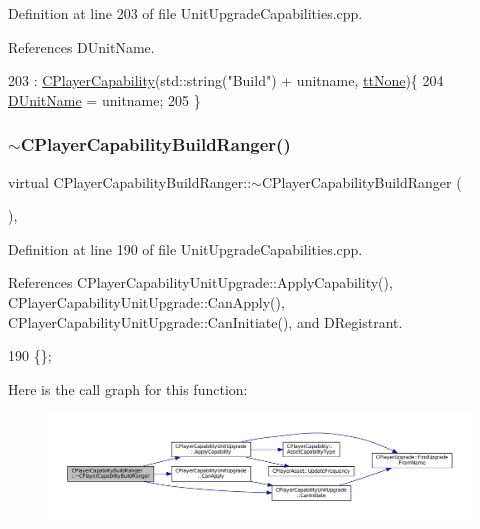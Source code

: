 Definition at line 203 of file Unit\+Upgrade\+Capabilities.\+cpp.



References D\+Unit\+Name.


\begin{DoxyCode}
203                                                                                     : 
      \hyperlink{classCPlayerCapability_a303de62aba5d3f65d9a8e013c64a96c1}{CPlayerCapability}(std::string(\textcolor{stringliteral}{"Build"}) + unitname, \hyperlink{classCPlayerCapability_a9d3450ed1532fd536bd6cbb1e2eef02fac78f0e806a6b0ead030d63c27c9ce929}{ttNone})\{
204     \hyperlink{classCPlayerCapabilityBuildRanger_a4e85674699365fe1e77bcb2a1996d7ba}{DUnitName} = unitname;
205 \}
\end{DoxyCode}
\hypertarget{classCPlayerCapabilityBuildRanger_a624146c70790e8a3d85db28a42a466d2}{}\label{classCPlayerCapabilityBuildRanger_a624146c70790e8a3d85db28a42a466d2} 
\subsubsection{\texorpdfstring{$\sim$\+C\+Player\+Capability\+Build\+Ranger()}{~CPlayerCapabilityBuildRanger()}}
{\footnotesize\ttfamily virtual C\+Player\+Capability\+Build\+Ranger\+::$\sim$\+C\+Player\+Capability\+Build\+Ranger (\begin{DoxyParamCaption}{ }\end{DoxyParamCaption})\hspace{0.3cm}{\ttfamily [inline]}, {\ttfamily [virtual]}}



Definition at line 190 of file Unit\+Upgrade\+Capabilities.\+cpp.



References C\+Player\+Capability\+Unit\+Upgrade\+::\+Apply\+Capability(), C\+Player\+Capability\+Unit\+Upgrade\+::\+Can\+Apply(), C\+Player\+Capability\+Unit\+Upgrade\+::\+Can\+Initiate(), and D\+Registrant.


\begin{DoxyCode}
190 \{\};
\end{DoxyCode}
Here is the call graph for this function\+:\nopagebreak
\begin{figure}[H]
\begin{center}
\leavevmode
\includegraphics[width=350pt]{classCPlayerCapabilityBuildRanger_a624146c70790e8a3d85db28a42a466d2_cgraph}
\end{center}
\end{figure}


